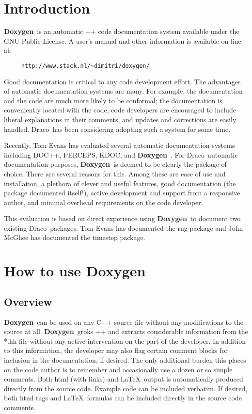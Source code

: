 \documentclass[11pt]{nmemo}
\newcommand{\draco}{{\normalfont\sffamily Draco}}
\newcommand{\doxy}{{\normalfont\bfseries Doxygen}}
\begin{document}

\section{Introduction}

\doxy\ is an automatic \C++ code documentation system available under
the GNU Public License.  A user's manual and other information is
available on-line at:
\begin{verbatim} 
     http://www.stack.nl/~dimitri/doxygen/ 
\end{verbatim}

Good documentation is critical to any code development effort.  The
advantages of automatic documentation systems are many.  For example,
the documentation and the code are much more likely to be conformal;
the documentation is conveniently located with the code, code
developers are encouraged to include liberal explanations in their
comments, and updates and corrections are easily handled.  \draco\ has
been considering adopting such a system for some time.


Recently, Tom Evans has evaluated several automatic documentation
systems including DOC++, PERCEPS, KDOC, and \doxy\ .  For \draco\ 
automatic documentation purposes, \doxy\ is deemed to be clearly the
package of choice. There are several reasons for this. Among these are
ease of use and installation, a plethora of clever and useful
features, good documentation (the package documented itself!), active
development and support from a responsive author, and minimal overhead
requirements on the code developer.


This evaluation is based on direct experience using \doxy\ to document
two existing \draco\ packages.  Tom Evans has documented the rng package and
John McGhee has documented the timestep package.  


\section{How to use \doxy\ }

\subsection{Overview}

\doxy\ can be used on any C++ source file
without any modifications to the source at all.  
\doxy\ groks \C++ and extracts considerable information from the *.hh
file without any active intervention on the part of the developer.
In addition to this information, the developer may also flag certain
comment blocks for inclusion in the documentation, if desired.
The only additional burden this places on the code author is to 
remember and occasionally use a dozen or so
simple comments. Both html (with links)
and \LaTeX\ output is automatically produced directly from the source code.
Example code can be included verbatim. If desired, both  html tags and \LaTeX\
formulas can be included directly in the source code comments. 
\end{document}
